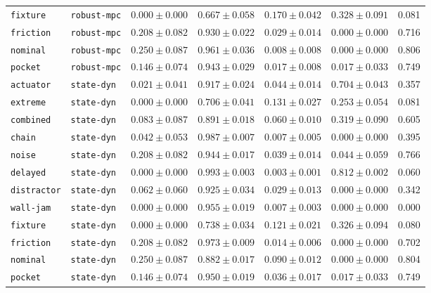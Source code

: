 \documentclass{article}
\begin{document}
\begin{center}
\begin{tabular}{llccccc}
\texttt{fixture} & \texttt{robust-mpc} & $0.000 \pm 0.000$ & $0.667 \pm 0.058$ & $0.170 \pm 0.042$ & $0.328 \pm 0.091$ & 0.081 \\
\texttt{friction} & \texttt{robust-mpc} & $0.208 \pm 0.082$ & $0.930 \pm 0.022$ & $0.029 \pm 0.014$ & $0.000 \pm 0.000$ & 0.716 \\
\texttt{nominal} & \texttt{robust-mpc} & $0.250 \pm 0.087$ & $0.961 \pm 0.036$ & $0.008 \pm 0.008$ & $0.000 \pm 0.000$ & 0.806 \\
\texttt{pocket} & \texttt{robust-mpc} & $0.146 \pm 0.074$ & $0.943 \pm 0.029$ & $0.017 \pm 0.008$ & $0.017 \pm 0.033$ & 0.749 \\
\texttt{actuator} & \texttt{state-dyn} & $0.021 \pm 0.041$ & $0.917 \pm 0.024$ & $0.044 \pm 0.014$ & $0.704 \pm 0.043$ & 0.357 \\
\texttt{extreme} & \texttt{state-dyn} & $0.000 \pm 0.000$ & $0.706 \pm 0.041$ & $0.131 \pm 0.027$ & $0.253 \pm 0.054$ & 0.081 \\
\texttt{combined} & \texttt{state-dyn} & $0.083 \pm 0.087$ & $0.891 \pm 0.018$ & $0.060 \pm 0.010$ & $0.319 \pm 0.090$ & 0.605 \\
\texttt{chain} & \texttt{state-dyn} & $0.042 \pm 0.053$ & $0.987 \pm 0.007$ & $0.007 \pm 0.005$ & $0.000 \pm 0.000$ & 0.395 \\
\texttt{noise} & \texttt{state-dyn} & $0.208 \pm 0.082$ & $0.944 \pm 0.017$ & $0.039 \pm 0.014$ & $0.044 \pm 0.059$ & 0.766 \\
\texttt{delayed} & \texttt{state-dyn} & $0.000 \pm 0.000$ & $0.993 \pm 0.003$ & $0.003 \pm 0.001$ & $0.812 \pm 0.002$ & 0.060 \\
\texttt{distractor} & \texttt{state-dyn} & $0.062 \pm 0.060$ & $0.925 \pm 0.034$ & $0.029 \pm 0.013$ & $0.000 \pm 0.000$ & 0.342 \\
\texttt{wall-jam} & \texttt{state-dyn} & $0.000 \pm 0.000$ & $0.955 \pm 0.019$ & $0.007 \pm 0.003$ & $0.000 \pm 0.000$ & 0.000 \\
\texttt{fixture} & \texttt{state-dyn} & $0.000 \pm 0.000$ & $0.738 \pm 0.034$ & $0.121 \pm 0.021$ & $0.326 \pm 0.094$ & 0.080 \\
\texttt{friction} & \texttt{state-dyn} & $0.208 \pm 0.082$ & $0.973 \pm 0.009$ & $0.014 \pm 0.006$ & $0.000 \pm 0.000$ & 0.702 \\
\texttt{nominal} & \texttt{state-dyn} & $0.250 \pm 0.087$ & $0.882 \pm 0.017$ & $0.090 \pm 0.012$ & $0.000 \pm 0.000$ & 0.804 \\
\texttt{pocket} & \texttt{state-dyn} & $0.146 \pm 0.074$ & $0.950 \pm 0.019$ & $0.036 \pm 0.017$ & $0.017 \pm 0.033$ & 0.749 \\

\end{tabular}
\end{center}
\end{document}
